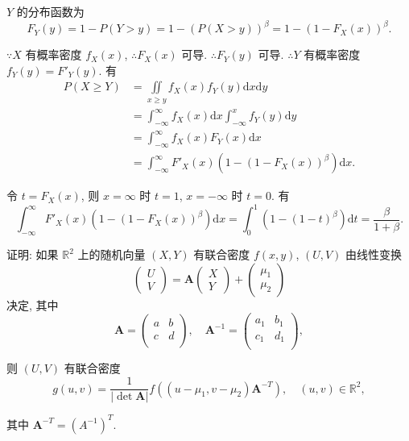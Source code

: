 \documentclass{ctexart}
\begin{document}
\begin{solution}
    $Y$ 的分布函数为
    \[F_Y(y)=1-P(Y>y)=1-(P(X>y))^\beta=1-(1-F_X(x))^\beta.\]

    $\because X$ 有概率密度 $f_X(x)$, $\therefore F_X(x)$ 可导. $\therefore F_Y(y)$ 可导. $\therefore Y$ 有概率密度 $f_Y(y)=F'_Y(y)$. 有
    \begin{align*}
        P(X\geq Y) & =\iint\limits_{x\geq y}f_X(x)f_Y(y)\mathrm{d}x\mathrm{d}y \\
        & =\int_{-\infty}^\infty f_X(x)\mathrm{d}x\int_{-\infty}^x f_Y(y)\mathrm{d}y \\
        & =\int_{-\infty}^\infty f_X(x)F_Y(x)\mathrm{d}x \\
        & =\int_{-\infty}^\infty F'_X(x)(1-(1-F_X(x))^\beta)\mathrm{d}x.
    \end{align*}

    令 $t=F_X(x)$, 则 $x=\infty$ 时 $t=1$, $x=-\infty$ 时 $t=0$. 有
    \[\int_{-\infty}^\infty F'_X(x)(1-(1-F_X(x))^\beta)\mathrm{d}x=\int_0^1(1-(1-t)^\beta)\mathrm{d}t=\dfrac{\beta}{1+\beta}.\]
\end{solution}
\begin{exercise}[有修改]\label{ex4.36}
    证明: 如果 $\mathbb{R}^2$ 上的随机向量 $(X,Y)$ 有联合密度 $f(x,y)$, $(U,V)$ 由线性变换
    \[\begin{pmatrix}
        U \\ V
    \end{pmatrix}=\boldsymbol{A}\begin{pmatrix}
        X \\ Y
    \end{pmatrix}+\begin{pmatrix}
        \mu_1 \\ \mu_2
    \end{pmatrix}\]
    决定, 其中
    \[\boldsymbol{A}=\begin{pmatrix}
        a & b \\
        c & d \\
    \end{pmatrix},\quad\boldsymbol{A}^{-1}=\begin{pmatrix}
        a_1 & b_1 \\
        c_1 & d_1 \\
    \end{pmatrix},\]

    则 $(U,V)$ 有联合密度
    \[g(u,v)=\dfrac{1}{|\det\boldsymbol{A}|}f((u-\mu_1,v-\mu_2)\boldsymbol{A}^{-T}),\quad(u,v)\in\mathbb{R}^2,\]

    其中 $\boldsymbol{A}^{-T}=(A^{-1})^T$.
\end{exercise}
\end{document}
